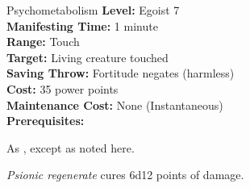 {Psychometabolism}
{
	\textbf{Level:}
	Egoist 7\\
	\textbf{Manifesting Time:}
	1 minute\\
	\textbf{Range:}
	Touch\\
	\textbf{Target:}
	Living creature touched\\
	\textbf{Saving Throw:}
	Fortitude negates (harmless)\\
	\textbf{Cost:}
	35 power points\\
	\textbf{Maintenance Cost:}
	None (Instantaneous)\\
	\textbf{Prerequisites:}
	\\
}
{
	As , except as noted here.

	\emph{Psionic regenerate} cures 6d12 points of damage.
}